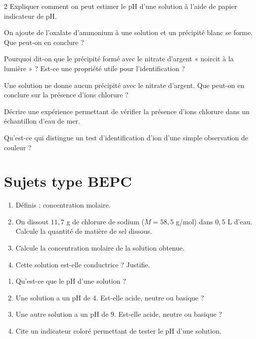 \begin{multicols}{2}
\exo{} Expliquer comment on peut estimer le pH d'une solution à l'aide de papier
indicateur de pH.

\exo{} On ajoute de l'oxalate d'ammonium à une solution et un précipité blanc se
forme. Que peut-on en conclure ?

\exo{} Pourquoi dit-on que le précipité formé avec le nitrate d'argent
« noircit à la lumière » ? Est-ce une propriété utile pour l'identification ?

\exo{} Une solution ne donne aucun précipité avec le nitrate d'argent. Que
peut-on en conclure sur la présence d'ions chlorure ?

\exo{} Décrire une expérience permettant de vérifier la présence d'ions chlorure
dans un échantillon d'eau de mer.

\exo{} Qu'est-ce qui distingue un test d'identification d'ion d'une simple
observation de couleur ?

\end{multicols}

\section{Sujets type BEPC}

\begin{enumerate}[label=\arabic*)]
\item Définis : concentration molaire.
\item On dissout $11{,}7$ g de chlorure de sodium ($M=58{,}5$ g/mol) dans $0{,}5$ L d'eau.
Calcule la quantité de matière de sel dissous.
\item Calcule la concentration molaire de la solution obtenue.
\item Cette solution est-elle conductrice ? Justifie.
\end{enumerate}

\begin{enumerate}[label=\arabic*)]
\item Qu'est-ce que le pH d'une solution ?
\item Une solution a un pH de $4$. Est-elle acide, neutre ou basique ?
\item Une autre solution a un pH de $9$. Est-elle acide, neutre ou basique ?
\item Cite un indicateur coloré permettant de tester le pH d'une solution.
\end{enumerate}

